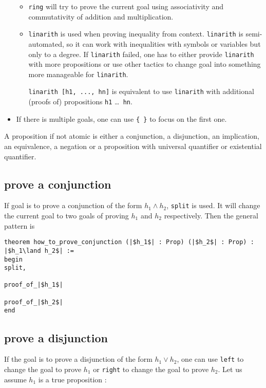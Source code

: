 \documentclass{report}
\theoremstyle{definition}
\theoremstyle{plain}
\begin{document}
\begin{itemize}
\begin{itemize}
    \item {\tt ring} will try to prove the current goal using associativity and commutativity of addition and multiplication.
    \item {\tt linarith} is used when proving inequality from context. {\tt linarith} is semi-automated, so it can work with inequalities with symbols or variables but only to a degree. If {\tt linarith} failed, one has to either provide {\tt linarith} with more propositions or use other tactics to change goal into something more manageable for {\tt linarith}.
  
    {\tt linarith [h1, ..., hn]} is equivalent to use {\tt linarith} with additional (proofs of) propositions {\tt h1} \dots {\tt { hn}}.
  \end{itemize}

  \item If there is multiple goals, one can use {\tt \{ \}} to focus on the first one.
\end{itemize}


A proposition if not atomic is either a conjunction, a disjunction, an implication, an equivalence, a negation or a proposition with universal quantifier or existential quantifier.

\subsection{prove a conjunction}\label{lean:conj}
If goal is to prove a conjunction of the form $h_1 \land h_2$, {\tt split} is used. It will change the current goal to two goals of proving $h_1$ and $h_2$ respectively. Then the general pattern is

\begin{verbatim}
theorem how_to_prove_conjunction (|$h_1$| : Prop) (|$h_2$| : Prop) : |$h_1\land h_2$| :=
begin
split,

proof_of_|$h_1$|

proof_of_|$h_2$|
end
\end{verbatim}


\subsection{prove a disjunction}\label{lean:disjun}
If the goal is to prove a disjunction of the form $h_1 \lor h_2$, one can use {\tt left} to change the goal to prove $h_1$ or {\tt right} to change the goal to prove $h_2$. Let us assume $h_1$ is a true proposition :
\end{document}
